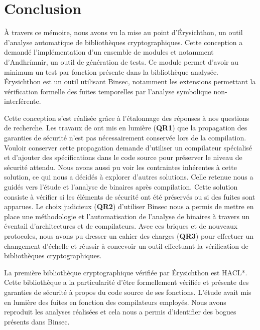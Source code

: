 \chapter*{Conclusion}

À travers ce mémoire, nous avons vu la mise au point d'Érysichthon, un outil d'analyse automatique de bibliothèques cryptographiques. Cette conception a demandé l'implémentation d'un ensemble de modules et notamment d'Andhrímnir, un outil de génération de tests. Ce module permet d'avoir au minimum un test par fonction présente dans la bibliothèque analysée. Érysichthon est un outil utilisant Binsec, notamment les extensions permettant la vérification formelle des fuites temporelles par l'analyse symbolique non-interférente.\smallbreak

Cette conception s'est réalisée grâce à l'étalonnage des réponses à nos questions de recherche. Les travaux de \citeauthor{schneider2024breakingbadcompilersbreak} ont mis en lumière (\textbf{QR1}) que la propagation des garanties de sécurité n'est pas nécessairement conservée lors de la compilation. Vouloir conserver cette propagation demande d'utiliser un compilateur spécialisé et d'ajouter des spécifications dans le code source pour préserver le niveau de sécurité attendu. Nous avons aussi pu voir les contraintes inhérentes à cette solution, ce qui nous a décidés à explorer d'autres solutions. Celle retenue nous a guidés vers l'étude et l'analyse de binaires après compilation. Cette solution consiste à vérifier si les éléments de sécurité ont été préservés ou si des fuites sont apparues. Le choix judicieux (\textbf{QR2}) d'utiliser Binsec nous a permis de mettre en place une méthodologie et l'automatisation de l'analyse de binaires à travers un éventail d'architectures et de compilateurs. Avec ces briques et de nouveaux protocoles, nous avons pu dresser un cahier des charges (\textbf{QR3}) pour effectuer un changement d'échelle et réussir à concevoir un outil effectuant la vérification de bibliothèques cryptographiques.\smallbreak

La première bibliothèque cryptographique vérifiée par Érysichthon est HACL*. Cette bibliothèque a la particularité d'être formellement vérifiée et présente des garanties de sécurité à propos du code source de ses fonctions. L'étude \cite{schneider2024breakingbadcompilersbreak} avait mis en lumière des fuites en fonction des compilateurs employés. Nous avons reproduit les analyses réalisées et cela nous a permis d'identifier des bogues présents dans Binsec.\smallbreak

